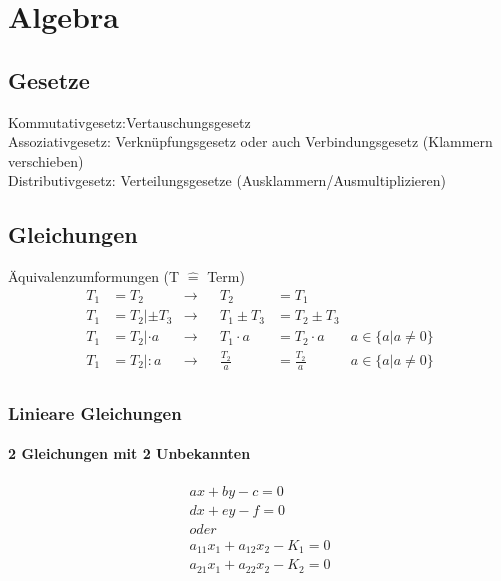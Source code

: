 \section{Algebra}
\subsection{Gesetze}
Kommutativgesetz:Vertauschungsgesetz \\
Assoziativgesetz: Verknüpfungsgesetz oder auch Verbindungsgesetz (Klammern verschieben) \\
Distributivgesetz: Verteilungsgesetze (Ausklammern/Ausmultiplizieren)







\subsection{Gleichungen}
Äquivalenzumformungen (T $\widehat{=}$ Term)
\begin{align*}
T_1 &= T_2 &\longrightarrow& & T_2 &= T_1 \\
T_1 &= T_2 | \pm T_3 &\longrightarrow& & T_1 \pm T_3 &= T_2 \pm T_3 \\
T_1 &= T_2 | \cdot a &\longrightarrow& & T_1 \cdot a &= T_2 \cdot a &a \in \{a|a \neq 0\} \\
T_1 &= T_2 | : a &\longrightarrow& & \frac{T_2}{a} &= \frac{T_2}{a} &a \in \{a|a \neq 0\} \\
\end{align*}


\subsubsection{Linieare Gleichungen}

\paragraph{2 Gleichungen mit 2 Unbekannten}

\begin{align*}
a x + by - c = 0\\
d x + e y - f = 0\\
oder \\
a_{11} x_1 + a_{12} x_2 - K_1 = 0\\
a_{21} x_1 + a_{22} x_2 - K_2 = 0\\
\end{align*}

